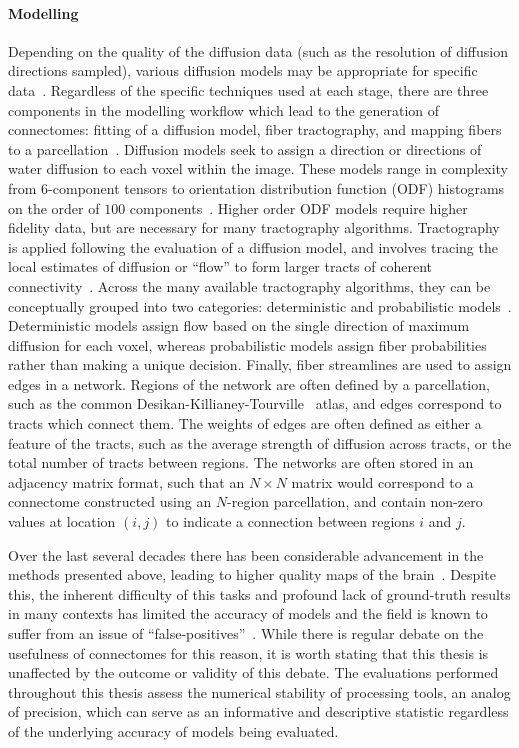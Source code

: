 \paragraph*{Modelling}
Depending on the quality of the diffusion data (such as the resolution of diffusion directions sampled), various
diffusion models may be appropriate for specific
data~\cite{jeurissen2019diffusion,tournier2011diffusion,mori2013introduction}. Regardless of the specific techniques
used at each stage, there are three components in the modelling workflow which lead to the generation of connectomes:
fitting of a diffusion model, fiber tractography, and mapping fibers to a
parcellation~\cite{roncal2013migraine,sporns2005human,Kiar2018-jt,Glasser2013-vf}. Diffusion models seek to assign a
direction or directions of water diffusion to each voxel within the image. These models range in complexity from
$6$-component tensors to orientation distribution function (ODF) histograms on the order of $100$
components~\cite{tournier2011diffusion}. Higher order ODF models require higher fidelity data, but are necessary for
many tractography algorithms. Tractography is applied following the evaluation of a diffusion model, and involves
tracing the local estimates of diffusion or ``flow'' to form larger tracts of coherent connectivity~\cite{behrens2014mr}.
Across the many available tractography algorithms, they can be conceptually grouped into two categories: deterministic
and probabilistic models~\cite{jeurissen2019diffusion}. Deterministic models assign flow based on the single direction of
maximum diffusion for each voxel, whereas probabilistic models assign fiber probabilities rather than making a unique
decision. Finally, fiber streamlines are used to assign edges in a network. Regions of the network are often defined by a
parcellation, such as the common Desikan-Killianey-Tourville~\cite{Klein2012-vi} atlas, and edges correspond to tracts
which connect them. The weights of edges are often defined as either a feature of the tracts, such as the average
strength of diffusion across tracts, or the total number of tracts between regions. The networks are often stored in an
adjacency matrix format, such that an $N \times N$ matrix would correspond to a connectome constructed using an
$N$-region parcellation, and contain non-zero values at location $(i,j)$ to indicate a connection between regions $i$ and
$j$.

Over the last several decades there has been considerable advancement in the methods presented above, leading to higher
quality maps of the brain~\cite{GIRARD2020117201}. Despite this, the inherent difficulty of this tasks and profound
lack of ground-truth results in many contexts has limited the accuracy of models and the field is known to suffer from
an issue of ``false-positives''~\cite{Thomas16574,sotiropoulos2019building,maier2017challenge}. While there is regular
debate on the usefulness of connectomes for this reason, it is worth stating that this thesis is unaffected by the
outcome or validity of this debate. The evaluations performed throughout this thesis assess the numerical stability of
processing tools, an analog of precision, which can serve as an informative and descriptive statistic regardless of the
underlying accuracy of models being evaluated.

